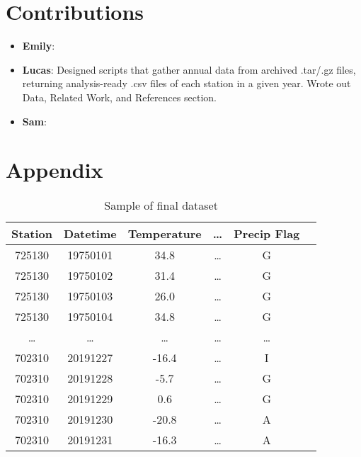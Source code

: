 \documentclass[conference]{IEEEtran}
\begin{document}
\section{Contributions}

\begin{itemize}
\item \textbf{Emily}:
\item \textbf{Lucas}: Designed scripts that gather annual data from archived .tar/.gz files, returning analysis-ready .csv files of each station in a given year. Wrote out Data, Related Work, and References section.
\item \textbf{Sam}:
\end{itemize}

\section{Appendix}

\begin{table}[h!]
\centering
 \begin{tabular}{||c c c c c c||}
 \hline
  Station& Datetime &Temperature & \dots & Precip Flag \\ [0.5ex]
 \hline\hline
 725130 & 19750101 & 34.8 & \dots & G \\
 725130 & 19750102 & 31.4 & \dots & G \\
 725130 & 19750103 & 26.0 & \dots & G \\
 725130 & 19750104 & 34.8 & \dots & G \\
 \dots & \dots & \dots & \dots & \dots \\
 702310 & 20191227 & -16.4 & \dots & I \\
 702310 & 20191228 & -5.7 & \dots & G \\
 702310 & 20191229 & 0.6 & \dots & G \\
 702310 & 20191230 & -20.8 & \dots & A \\
 702310 & 20191231 & -16.3 & \dots & A \\[1ex]

 \hline
 \end{tabular}
 \caption{Sample of final dataset}
\end{table}
\end{document}
